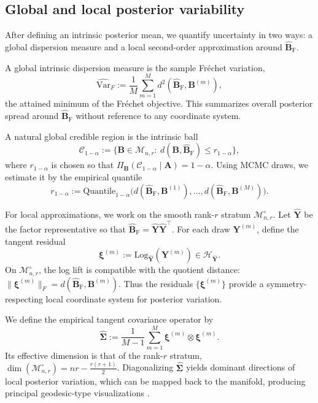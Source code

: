 \documentclass[12pt]{article}
\newcommand{\calC}{\mathcal{C}}
\newcommand{\calH}{\mathcal{H}}
\newcommand{\calMnr}{\mathcal{M}_{n,r}}
\newcommand{\calMnro}{\mathcal{M}^{\circ}_{n,r}} %
\newcommand{\bfA}{\boldsymbol{A}}
\newcommand{\bfB}{\boldsymbol{B}}
\newcommand{\bfY}{\boldsymbol{Y}}
\newcommand{\bfSigma}{\boldsymbol{\Sigma}}
\newcommand{\bfxi}{\boldsymbol{\xi}}
\newcommand{\Frechet}{Fr\'{e}chet\xspace}
\newcommand{\Log}{\mathrm{Log}}
\newcommand{\BhatF}{\widehat{\bfB}_{\mathrm{F}}}
\newcommand{\VarFhat}{\widehat{\mathrm{Var}}_{F}}
\begin{document}
\subsection{Global and local posterior variability}\label{subsec:var}

After defining an intrinsic posterior mean, we quantify uncertainty in two ways: a global dispersion
measure and a local second-order approximation around $\BhatF$.

A global intrinsic dispersion measure is the sample \Frechet variation,
\begin{equation}\label{eq:frechet-var}
\VarFhat := \frac{1}{M}\sum_{m=1}^M d^2(\BhatF,\bfB^{(m)}),
\end{equation}
the attained minimum of the \Frechet objective. This summarizes overall posterior spread around
$\BhatF$ without reference to any coordinate system.

A natural global credible region is the intrinsic ball
\[
\calC_{1-\alpha} := \{\bfB\in\calMnr:\ d(\bfB,\BhatF)\le r_{1-\alpha}\},
\]
where $r_{1-\alpha}$ is chosen so that
$\Pi_{\bfB}(\calC_{1-\alpha}\mid \bfA)=1-\alpha$. Using MCMC draws, we estimate it by the empirical
quantile
\[
r_{1-\alpha} := \mathrm{Quantile}_{1-\alpha}\big(d(\BhatF,\bfB^{(1)}),\ldots,d(\BhatF,\bfB^{(M)})\big).
\]

For local approximations, we work on the smooth rank-$r$ stratum $\calMnro$. Let $\hat{\bfY}$ be
the factor representative so that
$\BhatF=\hat{\bfY}\hat{\bfY}^\top$. For each draw $\bfY^{(m)}$, define the tangent residual
\[
\bfxi^{(m)} := \Log_{\hat{\bfY}}(\bfY^{(m)})\in\calH_{\hat{\bfY}}.
\]
On $\calMnro$, the log lift is compatible with the quotient distance:
$\|\bfxi^{(m)}\|_F=d(\BhatF,\bfB^{(m)})$. Thus the residuals
$\{\bfxi^{(m)}\}$ provide a symmetry-respecting local coordinate system for posterior variation.

We define the empirical tangent covariance operator by
\begin{equation}\label{eq:tangent-cov}
\widehat{\bfSigma}
:=
\frac{1}{M-1}\sum_{m=1}^M \bfxi^{(m)}\otimes \bfxi^{(m)}.
\end{equation}
Its effective dimension is that of the rank-$r$ stratum,
$\dim(\calMnro)=nr-\frac{r(r+1)}{2}$. Diagonalizing $\widehat{\bfSigma}$ yields dominant
directions of local posterior variation, which can be mapped back to the manifold, producing principal geodesic-type visualizations
\citep{fletcher_2004_PrincipalGeodesicAnalysis}.
\end{document}
